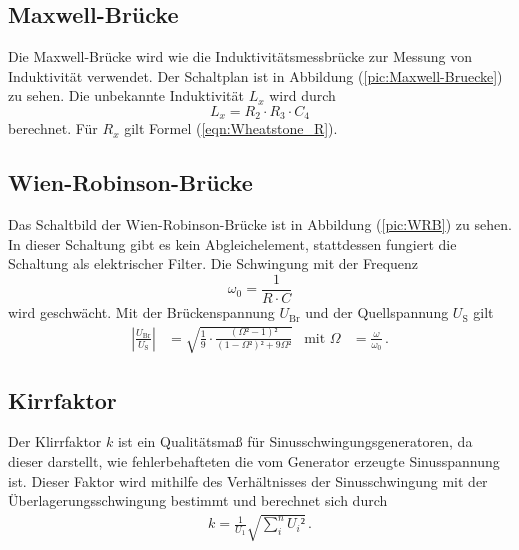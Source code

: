     \subsection{Maxwell-Brücke}
    Die Maxwell-Brücke wird wie die Induktivitätsmessbrücke zur Messung von Induktivität verwendet. Der Schaltplan ist in Abbildung (\ref{pic:Maxwell-Bruecke}) zu sehen. 
     Die unbekannte Induktivität $L_x$ wird durch 
    \begin{equation}
        \label{eqn:Induktivität_L_Maxwell}
        L_x = R_2 \cdot R_3 \cdot C_4 
    \end{equation}
    berechnet. Für $R_x$ gilt Formel (\ref{eqn:Wheatstone_R}). 
    \subsection{Wien-Robinson-Brücke}
    Das Schaltbild der Wien-Robinson-Brücke ist in Abbildung (\ref{pic:WRB}) zu sehen. In dieser Schaltung gibt es kein Abgleichelement, stattdessen fungiert die 
    Schaltung als elektrischer Filter. Die Schwingung mit der Frequenz 
    \begin{equation}
        \omega_0 = \frac{1}{R \cdot C}
        \label{eqn:omega_0}
    \end{equation}
   wird geschwächt. Mit der Brückenspannung $U_{\text{Br}}$ und der Quellspannung $U_{\text{S}}$ gilt
    \begin{align}
    \left| \frac{U_{\text{Br}}}{U_{\text{S}}}\right| &= \sqrt{\frac{1}{9} \cdot \frac{(\Omega² - 1)²}{(1-\Omega²)² + 9\Omega²}} & \text{mit} \,\, \Omega &= \frac{\omega}{\omega_0} \, .
    \label{eqn:Omega}
    \end{align}

    \subsection{Kirrfaktor}
    Der Klirrfaktor $k$ ist ein Qualitätsmaß für Sinusschwingungsgeneratoren, da dieser darstellt, wie fehlerbehafteten die vom Generator erzeugte Sinusspannung ist. 
    Dieser Faktor wird mithilfe des Verhältnisses der Sinusschwingung mit der Überlagerungsschwingung bestimmt und berechnet sich durch 
    \begin{align}
        k = \frac{1}{U_1} \sqrt{\sum_i ^n {{U_i}²}} \, .
    \label{eqn:Klirrfaktor}
    \end{align}
    
